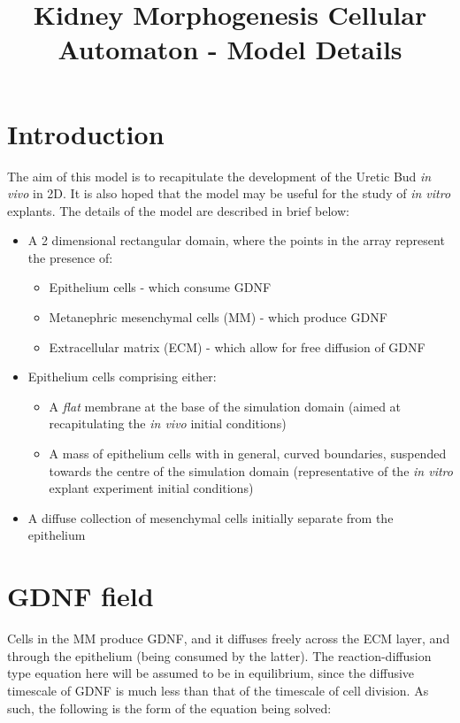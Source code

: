 \documentclass[pdftex,10pt,a4paper]{article}
\title{\textbf{Kidney Morphogenesis Cellular Automaton - Model Details}\newline }
\author{}
\begin{document}
\maketitle
\doublespacing
\section{Introduction}
The aim of this model is to recapitulate the development of the Uretic Bud \textit{in vivo} in 2D. It is also hoped that the model may be useful for the study of \textit{in vitro} explants. The details of the model are described in brief below:
\begin{itemize}
\item A 2 dimensional rectangular domain, where the points in the array represent the presence of:
\begin{itemize}
\item Epithelium cells - which consume GDNF
\item Metanephric mesenchymal cells (MM) - which produce GDNF
\item Extracellular matrix (ECM) - which allow for free diffusion of GDNF
\end{itemize}
\item Epithelium cells comprising either:
\begin{itemize}
\item A \textit{flat} membrane at the base of the simulation domain (aimed at recapitulating the \textit{in vivo} initial conditions)
\item A mass of epithelium cells with in general, curved boundaries, suspended towards the centre of the simulation domain (representative of the \textit{in vitro} explant experiment initial conditions)
\end{itemize}
\item A diffuse collection of mesenchymal cells initially separate from the epithelium
\end{itemize}

\section{GDNF field}
Cells in the MM produce GDNF, and it diffuses freely across the ECM layer, and through the epithelium (being consumed by the latter). The reaction-diffusion type equation here will be assumed to be in equilibrium, since the diffusive timescale of GDNF is much less than that of the timescale of cell division. As such, the following is the form of the equation being solved:
\end{document}
